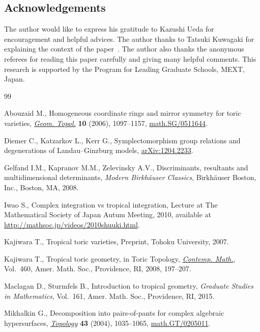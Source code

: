 \documentclass[10pt,a4paper]{amsart}
\numberwithin{equation}{section}
\begin{document}
\subsection*{Acknowledgements}
The author would like to express his gratitude to Kazushi Ueda for encouragement and helpful advices. The author thanks to Tatsuki Kuwagaki for explaining the context of the paper~\cite{DKK}. The author also thanks the anonymous referees for reading this paper carefully and giving many helpful comments. This research is supported by the Program for Leading Graduate Schools, MEXT, Japan.


\begin{thebibliography}{99}
\footnotesize\itemsep=0pt

Abouzaid M., Homogeneous coordinate rings and mirror symmetry for toric
 varieties, \href{http://dx.doi.org/10.2140/gt.2006.10.1097}{\textit{Geom. Topol.}} \textbf{10} (2006), 1097--1157,
 \href{http://arxiv.org/abs/math.SG/0511644}{math.SG/0511644}.

Diemer C., Katzarkov L., Kerr G., Symplectomorphism group relations and
 degenerations of {L}andau--{G}inzburg models, \href{http://arxiv.org/abs/1204.2233}{arXiv:1204.2233}.

Gelfand I.M., Kapranov M.M., Zelevinsky A.V., Discriminants, resultants and
 multidimensional determinants, \textit{Modern Birkh\"auser Classics}, Birkh\"auser
 Boston, Inc., Boston, MA, 2008.

Iwao S., Complex integration vs tropical integration, {L}ecture at The
 {M}athematical {S}ociety of {J}apan {A}utum {M}eeting, 2010, available at \url{http://mathsoc.jp/videos/2010shuuki.html}.

Kajiwara T., Tropical toric varieties, {P}reprint, Tohoku University, 2007.

Kajiwara T., Tropical toric geometry, in Toric Topology, \href{http://dx.doi.org/10.1090/conm/460/09018}{\textit{Contemp.
 Math.}}, Vol.~460, Amer. Math. Soc., Providence, RI, 2008, 197--207.

Maclagan D., Sturmfels B., Introduction to tropical geometry, \textit{Graduate
 Studies in Mathematics}, Vol.~161, Amer. Math. Soc., Providence, RI, 2015.

Mikhalkin G., Decomposition into pairs-of-pants for complex algebraic
 hypersurfaces, \href{http://dx.doi.org/10.1016/j.top.2003.11.006}{\textit{Topology}} \textbf{43} (2004), 1035--1065,
 \href{http://arxiv.org/abs/math.GT/0205011}{math.GT/0205011}.


\end{thebibliography}
\end{document}
